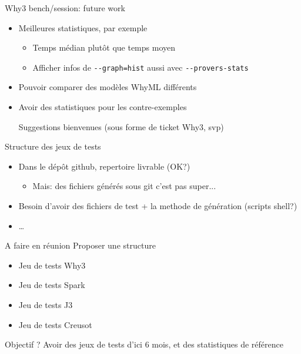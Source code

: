 \documentclass{beamer}
\newcommand{\why}{\lstinline[language=why3]}
\begin{document}
\begin{frame}{Why3 bench/session: future work}

  \begin{itemize}
  \item Meilleures statistiques, par exemple
    \begin{itemize}
    \item Temps médian plutôt que temps moyen
    \item Afficher infos de \why{--graph=hist} aussi avec \why{--provers-stats}
  \end{itemize}

\item Pouvoir comparer des modèles WhyML différents

\item Avoir des statistiques pour les contre-exemples


  \begin{block}{Suggestions bienvenues}
    (sous forme de ticket Why3, svp)
  \end{block}

\end{itemize}

\end{frame}

\begin{frame}{Structure des jeux de tests}

  \begin{itemize}
  \item Dans le dépôt github, repertoire livrable (OK?)
    \begin{itemize}
    \item Mais: des fichiers générés sous git c'est pas super...
    \end{itemize}
  \item Besoin d'avoir des fichiers de test + la methode de génération (scripts shell?)
  \item \ldots
  \end{itemize}

  \begin{block}{A faire en réunion}
    Proposer une structure
    \begin{itemize}
    \item Jeu de tests Why3
    \item Jeu de tests Spark
    \item Jeu de tests J3
    \item Jeu de tests Creusot
    \end{itemize}
  \end{block}

  \begin{block}{Objectif ?}
    Avoir des jeux de tests d'ici 6 mois, et des statistiques de référence
  \end{block}

\end{frame}
\end{document}
